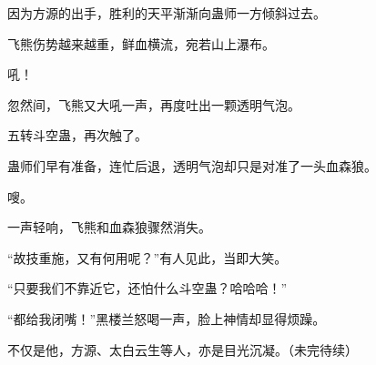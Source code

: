 \begin{this_body}
因为方源的出手，胜利的天平渐渐向蛊师一方倾斜过去。

飞熊伤势越来越重，鲜血横流，宛若山上瀑布。

吼！

忽然间，飞熊又大吼一声，再度吐出一颗透明气泡。

五转斗空蛊，再次触了。

蛊师们早有准备，连忙后退，透明气泡却只是对准了一头血森狼。

嗖。

一声轻响，飞熊和血森狼骤然消失。

“故技重施，又有何用呢？”有人见此，当即大笑。

“只要我们不靠近它，还怕什么斗空蛊？哈哈哈！”

“都给我闭嘴！”黑楼兰怒喝一声，脸上神情却显得烦躁。

不仅是他，方源、太白云生等人，亦是目光沉凝。（未完待续）

\end{this_body}

